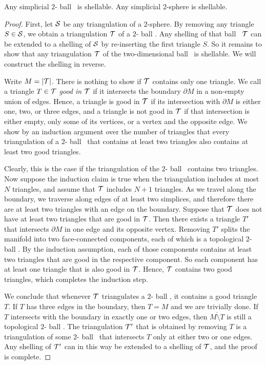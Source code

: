 \documentclass[10pt,a4paper]{article}
\newcommand\cye[1]{%
\protect\leavevmode
\begingroup
    \color{blue}%
    #1%
\endgroup
}
\newcommand{\disk}{\cye{ball}}
\newcommand{\todo}[1]{{\color{RedOrange}\textbf{#1}}}
\begin{document}
\begin{lemma}\label{lemma:shell_2D}
    Any simplicial $2$-\disk\ is shellable.
    Any simplicial $2$-sphere is shellable. 
\end{lemma}
\begin{proof}
    First, 
    let ${\mathcal S}$ be any triangulation of a $2$-sphere. 
    By removing any triangle $S \in {\mathcal S}$, we obtain a triangulation ${\mathcal T}$ of a $2$-\disk.
    Any shelling of that \disk\ \todo{${\mathcal T}$} can be extended to a shelling of ${\mathcal S}$ by re-inserting the first triangle $S$.
    So it remains to show that any triangulation ${\mathcal T}$ of the two-dimensional \disk\ is shellable. 
    We will construct the shelling in reverse. 
    
    Write $M = \left| {\mathcal T} \right|$. 
    There is nothing to show if ${\mathcal T}$ contains only one triangle. 
    We call a triangle $T \in {\mathcal T}$ \emph{good in ${\mathcal T}$} if it intersects the boundary $\partial M$ in a non-empty union of edges. 
    Hence, a triangle is good in ${\mathcal T}$ if its intersection with $\partial M$ is either one, two, or three edges,
    and a triangle is not good in ${\mathcal T}$ if that intersection is either empty, only some of its vertices, or a vertex and the opposite edge.
    We show by an induction argument over the number of triangles that every triangulation of a $2$-\disk\ that contains at least two triangles also contains at least two good triangles. 

    Clearly, this is the case if the triangulation of the $2$-\disk\ contains two triangles. 
    Now suppose the induction claim is true when the triangulation includes at most $N$ triangles,
    and assume that ${\mathcal T}$ includes $N+1$ triangles. 
    As we travel along the boundary, we traverse along edges of at least two simplices, 
    and therefore there are at least two triangles with an edge on the boundary. 
    Suppose that ${\mathcal T}$ does not have at least two triangles that are good in ${\mathcal T}$.
    Then there exists a triangle $T'$ that intersects $\partial M$ 
    in one edge and its opposite vertex.
    Removing $T'$ splits the manifold into two face-connected components, each of which is a topological $2$-\disk. 
    By the induction assumption, each of those components contains at least two triangles 
    that are good in the respective component. 
    So each component has at least one triangle that is also good in ${\mathcal T}$. 
    Hence, ${\mathcal T}$ contains two good triangles, which completes the induction step. 
    
    We conclude that whenever ${\mathcal T}$ triangulates a $2$-\disk,
    it contains a good triangle $T$. 
    If $T$ has three edges in the boundary, then $T = M$ and we are trivially done. 
    If $T$ intersects with the boundary in exactly one or two edges, 
    then $\overline{M \setminus T}$ is still a topological $2$-\disk.
    The triangulation ${\mathcal T}'$ that is obtained by removing $T$
    is a triangulation of some $2$-\disk\ that intersects $T$ only at either two or one edges.
    Any shelling of ${\mathcal T}'$ can in this way be extended to a shelling of ${\mathcal T}$, and the proof is complete. 
\end{proof}
\end{document}
